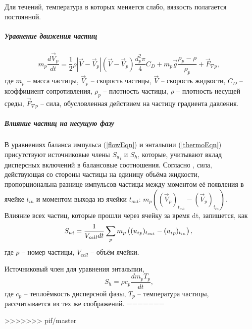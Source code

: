 				Для течений, температура в которых меняется слабо, вязкость полагается постоянной.
		\subparagraph{Уравнение движения частиц}
			\begin{equation}
				m_p \frac{d \vec{V}_p}{dt} = \frac{1}{2}\rho |\vec{V}-\vec{V}_p|(\vec{V}-\vec{V}_p)\frac{d_p^2 \pi}{4}C_D + m_p \vec{g}\frac{\rho_p-\rho}{\rho_p} + \vec{F}_{\nabla{p}},		
			\end{equation}
			где $m_p$ -- масса частицы, $\vec{V}_p$ -- скорость частицы, $\vec{V}$ -- скорость жидкости, $C_D$ -- коэффициент сопротивления, $\rho_p$ -- плотность частицы, $\rho$ -- плотность несущей среды, $\vec{F}_{\nabla{p}}$ -- сила, обусловленная действием на частицу градиента давления.
		\subparagraph{Влияние частиц на несущую фазу\\}
		
		В уравнениях баланса импульса (\ref{flowEqn}) и энтальпии (\ref{thermoEqn}) присутствуют источниковые члены ${S_u}_i$ и $S_h$, которые, учитывают вклад дисперсных включений в балансовые соотношения. Согласно \cite{Vallier}, сила, действующая со стороны частицы на единицу объёма жидкости, пропорциональна разнице импульсов частицы между моментом её появления в ячейке $t_{in}$ и моментом выхода из ячейки $t_{out}$: $m_p\left( (\vec{V}_p)_{t_{out}} - (\vec{V}_p)_{t_{in}}\right)$. Влияние всех частиц, которые прошли через ячейку за время dt, запишется, как
		\begin{equation}
			{S_u}_i = \frac{1}{V_{cell}dt} \sum_p m_p \left( ({u_i}_p)_{t_{out}} - ({u_i}_p)_{t_{in}}\right),\\
		\end{equation}
		где $p$ -- номер частицы, $V_{cell}$ -- объём ячейки.
		
		Источниковый член для уравнения энтальпии,
		\begin{equation}
			S_h = \rho c_p \frac{d m_p T_p}{dt},
		\end{equation}
		где $c_p$ -- теплоёмкость дисперсной фазы, $T_p$ -- температура частицы, рассчитывается из тех же соображений.
=======
		
>>>>>>> pif/master
